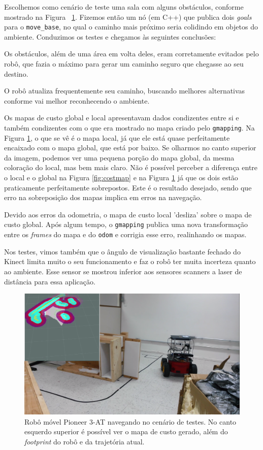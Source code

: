 Escolhemos como cenário de teste uma sala com alguns obstáculos, conforme mostrado na Figura ~\ref{fig:nav}. Fizemos então um nó (em C++) que publica dois \textit{goals} para o \verb|move_base|, no qual o caminho mais próximo seria colidindo em objetos do ambiente. Conduzimos os testes e chegamos às seguintes conclusões:
\begin{compactitem}
\item Os obstáculos, além de uma área em volta deles, eram corretamente evitados pelo robô, que fazia o máximo para gerar um caminho seguro que chegasse ao seu destino. 
\item O robô atualiza frequentemente seu caminho, buscando melhores alternativas conforme vai melhor reconhecendo o ambiente.
\item Os mapas de custo global e local apresentavam dados condizentes entre si e também condizentes com o que era mostrado no mapa criado pelo \verb|gmapping|. Na Figura \ref{fig:nav}, o que se vê é o mapa local, já que ele está quase perfeitamente encaixado com o mapa global, que está por baixo. Se olharmos no canto superior da imagem, podemos ver uma pequena porção do mapa global, da mesma coloração do local, mas bem mais claro. Não é possível perceber a diferença entre o local e o global na Figura \ref{fig:costmap} e na Figura \ref{fig:nav} já que os dois estão praticamente perfeitamente sobrepostos. Este é o resultado desejado, sendo que erro na sobreposição dos mapas implica em erros na navegação.
\item Devido aos erros da odometria, o mapa de custo local 'desliza' sobre o mapa de custo global. Após algum tempo, o \verb|gmapping| publica uma nova transformação entre os \textit{frames} do mapa e do \verb|odom| e corrigia esse erro, realinhando os mapas.
\item Nos testes, vimos também que o ângulo de visualização bastante fechado do Kinect limita muito o seu funcionamento e faz o robô ter muita incerteza quanto ao ambiente. Esse sensor se mostrou inferior aos sensores scanners a laser de distância para essa aplicação.
\end{compactitem} 

\begin{figure}[H]
\centering
  \includegraphics[width=12cm]{images/nav.png} 
\caption{\small{Robô móvel Pioneer 3-AT navegando no cenário de testes. No canto esquerdo superior é possível ver o mapa de custo gerado, além do \textit{footprint} do robô e da trajetória atual.}}
\label{fig:nav}
\end{figure}

